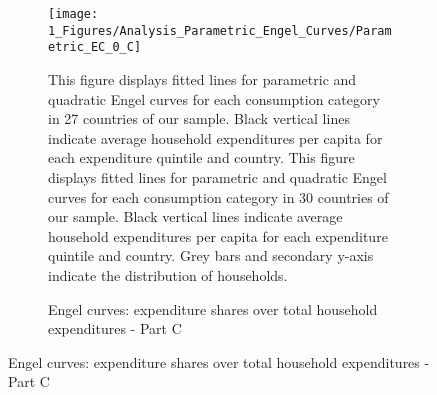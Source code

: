 \begin{figure}[ht!]\ContinuedFloat
   \begin{subfigure}[b]{\textwidth}
  \centering
    \caption{Engel curves: expenditure shares over total household expenditures - Part C} \label{fig:Engel_3}
  \texttt{[image: 1\_Figures/Analysis\_Parametric\_Engel\_Curves/Parametric\_EC\_0\_C]}
  \begin{subcaption2}
    This figure displays fitted lines for parametric and quadratic Engel curves for each consumption category in 27 countries of our sample. Black vertical lines indicate average household expenditures per capita for each expenditure quintile and country. This figure displays fitted lines for parametric and quadratic Engel curves for each consumption category in 30 countries of our sample. Black vertical lines indicate average household expenditures per capita for each expenditure quintile and country. Grey bars and secondary y-axis indicate the distribution of households.
  \end{subcaption2}
\end{subfigure}
\end{figure}


